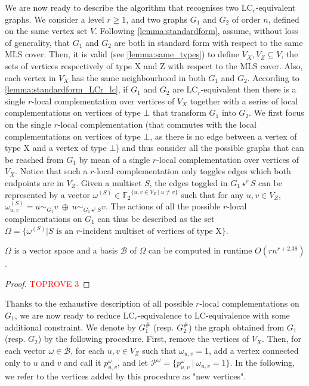 \documentclass[a4paper,UKenglish,cleveref,autoref,thm-restate]{arxiv}
\newcommand{\se}{\subseteq}
\newcommand{\gs}{\geqslant}
\begin{document}
We are now ready to describe the algorithm that recognises two LC$_r$-equivalent graphs. We consider a level $r \gs 1$, and two graphs $G_1$ and $G_2$ of order $n$, defined on the same vertex set $V$. Following \cref{lemma:standardform}, assume, without loss of generality, that $G_1$ and $G_2$ are both in standard form with respect to the same MLS cover. Then, it is valid (see \cref{lemma:same_types}) to define $V_X, V_Z \se V$, the sets of vertices respectively of type X and Z with respect to the MLS cover. Also, each vertex in $V_X$ has the same neighbourhood in both $G_1$ and $G_2$. According to \cref{lemma:standardform_LCr_lc}, if $G_1$ and $G_2$ are LC$_r$-equivalent then there is a single $r$-local complementation over vertices of $V_X$ together with a series of local complementations on vertices of type $\bot$ that transform $G_1$ into $G_2$. We first focus on the single $r$-local complementation (that commutes with the local complementations on vertices of type $\bot$, as there is no edge between a vertex of type X and a vertex of type $\bot$) and thus consider all the possible graphs that can be reached from $G_1$ by mean of a single $r$-local complementation over vertices of $V_X$. 
Notice that such a $r$-local complementation only toggles edges which both endpoints are in $V_Z$. Given a multiset $S$, the edges toggled in $G_1\star^r S$ can be represented by a vector $\omega^{(S)}\in {{\mathbb F}_2}^{\{u,v \in V_Z ~|~ u \neq v\}}$ such that for any $u,v \in V_Z$, $\omega^{(S)}_{u,v} = u\sim_{G_1} v ~\oplus~ u\sim_{G_1\star^r S} v$. The actions of all the possible $r$-local complementations on $G_1$ can thus be described as the set $\Omega =\{\omega^{(S)}  |  \text{$S$ is an $r$-incident multiset of vertices of type X}\}$. 


\begin{lemma} \label{lemma:omega}
    $\Omega$ is a vector space and a basis $\mathcal B$ of $\Omega$ can be computed in runtime $O(r n^{r+2.38})$.
\end{lemma}


\begin{proof}\textcolor{red}{TOPROVE 3}\end{proof}

Thanks to the exhaustive description of all possible $r$-local complementations on $G_1$, we are now ready to reduce LC$_r$-equivalence to LC-equivalence with some additional constraint. We denote by $G_1^{\#}$ (resp. $G_2^{\#}$) the graph obtained from $G_1$ (resp. $G_2$) by the following procedure. First, remove the vertices of $V_X$. Then, for each vector $\omega \in \mathcal B$, for each $u,v \in V_Z$ such that $\omega_{u,v} = 1$, add a vertex connected only to $u$ and $v$ and call it $p_{u,v}^{\omega}$, and let $\mathcal P^\omega= \{p_{u,v}^{\omega} ~|~ \omega_{u,v}=1\}$. In the following, we refer to the vertices added by this procedure as "new vertices". 
\end{document}

